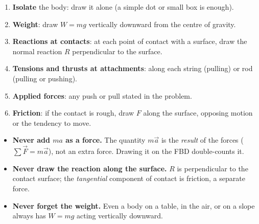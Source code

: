 \documentclass[11pt]{article}
\begin{document}
\begin{methode}
\begin{enumerate}
\item \textbf{Isolate} the body: draw it alone (a simple dot or small box is enough).
\item \textbf{Weight}: draw $W = mg$ vertically downward from the centre of gravity.
\item \textbf{Reactions at contacts}: at each point of contact with a surface, draw the normal reaction $R$ perpendicular to the surface.
\item \textbf{Tensions and thrusts at attachments}: along each string (pulling) or rod (pulling or pushing).
\item \textbf{Applied forces}: any push or pull stated in the problem.
\item \textbf{Friction}: if the contact is rough, draw $F$ along the surface, opposing motion or the tendency to move.
\end{enumerate}
\end{methode}

\begin{attention}
\begin{itemize}
\item \textbf{Never add $ma$ as a force.} The quantity $m\vec{a}$ is the \emph{result} of the forces ($\sum \vec{F} = m\vec{a}$), not an extra force. Drawing it on the FBD double-counts it.
\item \textbf{Never draw the reaction along the surface.} $R$ is perpendicular to the contact surface; the \emph{tangential} component of contact is friction, a separate force.
\item \textbf{Never forget the weight.} Even a body on a table, in the air, or on a slope always has $W = mg$ acting vertically downward.
\end{itemize}
\end{attention}
\end{document}
